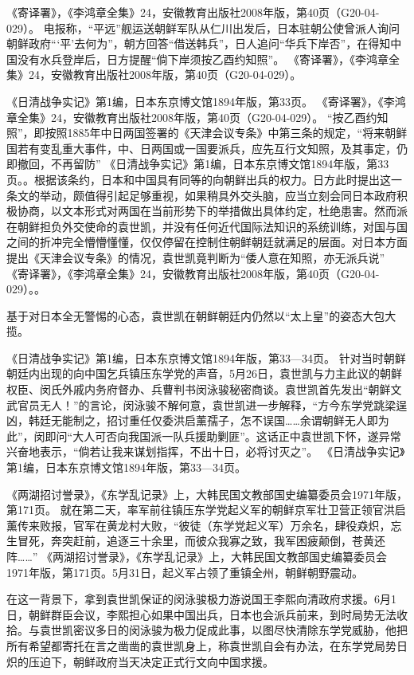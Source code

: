 \documentclass[12pt,UTF8]{ctexbook}
\begin{document}
《寄译署》，《李鸿章全集》24，安徽教育出版社2008年版，第40页（G20-04-029）。
电报称，“平远”舰运送朝鲜军队从仁川出发后，日本驻朝公使曾派人询问朝鲜政府“‘平’去何为”，朝方回答“借送韩兵”，日人追问“华兵下岸否”，在得知中国没有水兵登岸后，日方提醒“倘下岸须按乙酉约知照”。 《寄译署》，《李鸿章全集》24，安徽教育出版社2008年版，第40页（G20-04-029）。

《日清战争实记》第1编，日本东京博文馆1894年版，第33页。
《寄译署》，《李鸿章全集》24，安徽教育出版社2008年版，第40页（G20-04-029）。
“按乙酉约知照”，即按照1885年中日两国签署的《天津会议专条》中第三条的规定，“将来朝鲜国若有变乱重大事件，中、日两国或一国要派兵，应先互行文知照，及其事定，仍即撤回，不再留防” 《日清战争实记》第1编，日本东京博文馆1894年版，第33页。。根据该条约，日本和中国具有同等的向朝鲜出兵的权力。日方此时提出这一条文的举动，颇值得引起足够重视，如果稍具外交头脑，应当立刻会同日本政府积极协商，以文本形式对两国在当前形势下的举措做出具体约定，杜绝患害。然而派在朝鲜担负外交使命的袁世凯，并没有任何近代国际法知识的系统训练，对国与国之间的折冲完全懵懵懂懂，仅仅停留在控制住朝鲜朝廷就满足的层面。对日本方面提出《天津会议专条》的情况，袁世凯竟判断为“倭人意在知照，亦无派兵说” 《寄译署》，《李鸿章全集》24，安徽教育出版社2008年版，第40页（G20-04-029）。。

基于对日本全无警惕的心态，袁世凯在朝鲜朝廷内仍然以“太上皇”的姿态大包大揽。

《日清战争实记》第1编，日本东京博文馆1894年版，第33—34页。
针对当时朝鲜朝廷内出现的向中国乞兵镇压东学党的声音，5月26日，袁世凯与力主此议的朝鲜权臣、闵氏外戚内务府督办、兵曹判书闵泳骏秘密商谈。袁世凯首先发出“朝鲜文武官员无人！”的言论，闵泳骏不解何意，袁世凯进一步解释，“方今东学党跳梁逞凶，韩廷无能制之，招讨重任仅委洪启薰孺子，怎不误国……余谓朝鲜无人即为此”，闵即问“大人可否向我国派一队兵援助剿匪”。这话正中袁世凯下怀，遂异常兴奋地表示，“倘若让我来谋划指挥，不出十日，必将讨灭之”。 《日清战争实记》第1编，日本东京博文馆1894年版，第33—34页。

《两湖招讨誉录》，《东学乱记录》上，大韩民国文教部国史编纂委员会1971年版，第171页。
就在第二天，率军前往镇压东学党起义军的朝鲜京军壮卫营正领官洪启薰传来败报，官军在黄龙村大败，“彼徒（东学党起义军）万余名，肆役猋炽，忘生冒死，奔突赶前，追逐三十余里，而彼众我寡之致，我军困疲颠倒，苍黄还阵……” 《两湖招讨誉录》，《东学乱记录》上，大韩民国文教部国史编纂委员会1971年版，第171页。5月31日，起义军占领了重镇全州，朝鲜朝野震动。

在这一背景下，拿到袁世凯保证的闵泳骏极力游说国王李熙向清政府求援。6月1日，朝鲜群臣会议，李熙担心如果中国出兵，日本也会派兵前来，到时局势无法收拾。与袁世凯密议多日的闵泳骏为极力促成此事，以图尽快清除东学党威胁，他把所有希望都寄托在言之凿凿的袁世凯身上，称袁世凯自会有办法，在东学党局势日炽的压迫下，朝鲜政府当天决定正式行文向中国求援。
\end{document}
